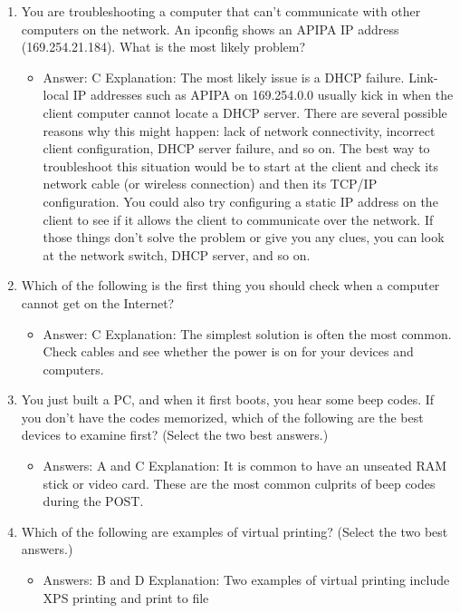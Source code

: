 \documentclass{article}
\begin{document}
\begin{enumerate}
\begin{itemize}
    \end{itemize}
    \item You are troubleshooting a computer that can’t communicate with
other computers on the network. An ipconfig shows an APIPA IP
address (169.254.21.184). What is the most likely problem?
    \begin{itemize}
        \item Answer: C
Explanation: The most likely issue is a DHCP failure. Link-local IP addresses such as
APIPA on 169.254.0.0 usually kick in when the client computer cannot locate a DHCP
server. There are several possible reasons why this might happen: lack of network connectivity,
incorrect client configuration, DHCP server failure, and so on. The best way to
troubleshoot this situation would be to start at the client and check its network cable (or
wireless connection) and then its TCP/IP configuration. You could also try configuring a
static IP address on the client to see if it allows the client to communicate over the network.
If those things don’t solve the problem or give you any clues, you can look at the
network switch, DHCP server, and so on.
    \end{itemize}
    \item Which of the following is the first thing you should check when a
computer cannot get on the Internet?
    \begin{itemize}
        \item Answer: C
Explanation: The simplest solution is often the most common. Check cables and see
whether the power is on for your devices and computers.
    \end{itemize}
    \item You just built a PC, and when it first boots, you hear some beep
codes. If you don’t have the codes memorized, which of the following
are the best devices to examine first? (Select the two best
answers.)
    \begin{itemize}
        \item Answers: A and C
Explanation: It is common to have an unseated RAM stick or video card. These are the
most common culprits of beep codes during the POST.
    \end{itemize}
    \item Which of the following are examples of virtual printing? (Select the
two best answers.)
    \begin{itemize}
        \item Answers: B and D
Explanation: Two examples of virtual printing include XPS printing and print to file

\end{itemize}
\end{enumerate}
\end{document}
